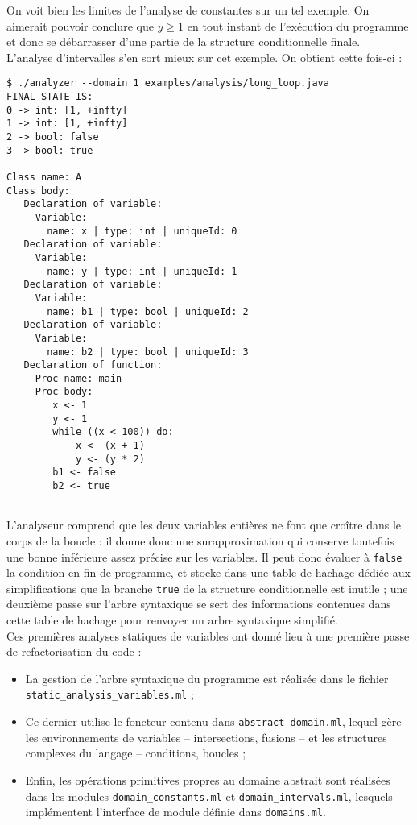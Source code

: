 \documentclass[paper=a4, fontsize=11pt]{scrartcl}
\numberwithin{figure}{section}			%
\numberwithin{table}{section}				%
\begin{document}
On voit bien les limites de l'analyse de constantes sur un tel exemple. On aimerait pouvoir conclure que $y \geq 1$ en tout instant de l'exécution du programme et donc se débarrasser d'une partie de la structure conditionnelle finale.\\

L'analyse d'intervalles s'en sort mieux sur cet exemple. On obtient cette fois-ci :
\begin{verbatim}
$ ./analyzer --domain 1 examples/analysis/long_loop.java
FINAL STATE IS:
0 -> int: [1, +infty]
1 -> int: [1, +infty]
2 -> bool: false
3 -> bool: true
----------
Class name: A
Class body:
   Declaration of variable:
     Variable:
       name: x | type: int | uniqueId: 0
   Declaration of variable:
     Variable:
       name: y | type: int | uniqueId: 1
   Declaration of variable:
     Variable:
       name: b1 | type: bool | uniqueId: 2
   Declaration of variable:
     Variable:
       name: b2 | type: bool | uniqueId: 3
   Declaration of function:
     Proc name: main
     Proc body:
        x <- 1
        y <- 1
        while ((x < 100)) do:
            x <- (x + 1)
            y <- (y * 2)
        b1 <- false
        b2 <- true
------------
\end{verbatim}

L'analyseur comprend que les deux variables entières ne font que croître dans le corps de la boucle : il donne donc une surapproximation qui conserve toutefois une bonne inférieure assez précise sur les variables. Il peut donc évaluer à \texttt{false} la condition en fin de programme, et stocke dans une table de hachage dédiée aux simplifications que la branche \texttt{true} de la structure conditionnelle est inutile ; une deuxième passe sur l'arbre syntaxique se sert des informations contenues dans cette table de hachage pour renvoyer un arbre syntaxique simplifié.\\

Ces premières analyses statiques de variables ont donné lieu à une première passe de refactorisation du code :

\begin{itemize}
\item La gestion de l'arbre syntaxique du programme est réalisée dans le fichier \newline \texttt{static\_analysis\_variables.ml} ;
\item Ce dernier utilise le foncteur contenu dans \texttt{abstract\_domain.ml}, lequel gère les environnements de variables -- intersections, fusions -- et les structures complexes du langage -- conditions, boucles ;
\item Enfin, les opérations primitives propres au domaine abstrait sont réalisées dans les modules \texttt{domain\_constants.ml} et \texttt{domain\_intervals.ml}, lesquels implémentent l'interface de module définie dans \texttt{domains.ml}.
\end{itemize}
\end{document}

